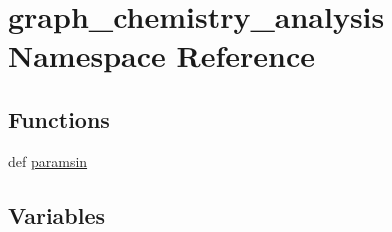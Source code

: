 \hypertarget{a00103}{\section{graph\-\_\-chemistry\-\_\-analysis Namespace Reference}
\label{a00103}
}
\subsection*{Functions}
\begin{DoxyCompactItemize}
\item 
def \hyperlink{a00103_a4f1cb8cacda7a862100a91f2bba21b49}{paramsin}
\end{DoxyCompactItemize}
\subsection*{Variables}
